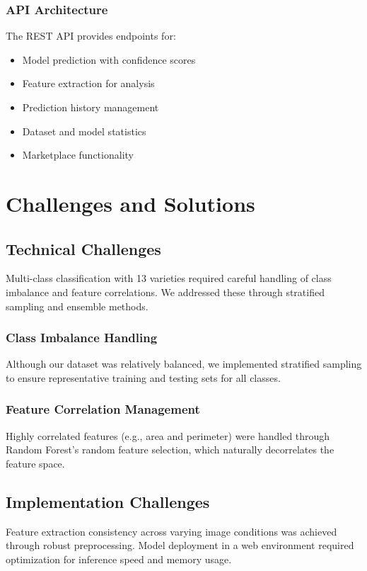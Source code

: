 \documentclass[conference]{IEEEtran}
\begin{document}
\subsubsection{API Architecture}
The REST API provides endpoints for:
\begin{itemize}
    \item Model prediction with confidence scores
    \item Feature extraction for analysis
    \item Prediction history management
    \item Dataset and model statistics
    \item Marketplace functionality
\end{itemize}

\section{Challenges and Solutions}

\subsection{Technical Challenges}

Multi-class classification with 13 varieties required careful handling of class imbalance and feature correlations. We addressed these through stratified sampling and ensemble methods.

\subsubsection{Class Imbalance Handling}
Although our dataset was relatively balanced, we implemented stratified sampling to ensure representative training and testing sets for all classes.

\subsubsection{Feature Correlation Management}
Highly correlated features (e.g., area and perimeter) were handled through Random Forest's random feature selection, which naturally decorrelates the feature space.

\subsection{Implementation Challenges}

Feature extraction consistency across varying image conditions was achieved through robust preprocessing. Model deployment in a web environment required optimization for inference speed and memory usage.
\end{document}
